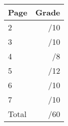 \documentclass[12pt]{article}
\newcommand{\skipline}{\vspace{12pt}}
\begin{document}
\begin{table}[hbt]
\begin{center}
\begin{tabular}{|l|r|} \hline
Page&Grade\\
\hline \hline
\cline{1-2} 2 & \enspace\enspace\enspace\enspace\enspace\enspace/10\\
\cline{1-2} 3 & \enspace\enspace\enspace\enspace\enspace\enspace/10\\
\cline{1-2} 4 & \enspace\enspace\enspace\enspace\enspace\enspace/8\\
\cline{1-2} 5 & \enspace\enspace\enspace\enspace\enspace\enspace/12\\
\cline{1-2} 6 & \enspace\enspace\enspace\enspace\enspace\enspace/10\\
\cline{1-2} 7 & \enspace\enspace\enspace\enspace\enspace\enspace/10\\
\cline{1-2} Total & \enspace\enspace\enspace\enspace\enspace\enspace/60\\
\hline
\end{tabular}

\skipline

\skipline

\skipline


\end{center}
\end{table}
\newpage
\end{document}
